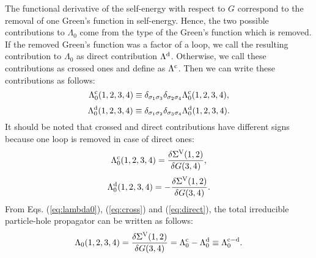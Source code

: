 The functional derivative of the self-energy with respect to $G$ 
correspond to the removal of one Green's function in self-energy. 
Hence, the two possible contributions to $\Lambda_0$ come from
the type of the Green's function which is removed.
If the removed Green's function was a factor of a loop, we call
the resulting contribution to $\Lambda_0$ as direct contribution $\Lambda^{\rm d}$.
Otherwise, we call these contributions as crossed ones and define as $\Lambda^{\rm c}$.
Then we can write these contributions as follows:
%
\begin{equation}
	\Lambda^{\rm c}_0(1,2,3,4) \equiv \delta_{\sigma_1\sigma_3}
	\delta_{\sigma_2\sigma_4}\Lambda^{\rm c}_0(1,2,3,4),
	\label{eq:defcross}
\end{equation}
%
\begin{equation}
	\Lambda^{\rm d}_0(1,2,3,4) \equiv \delta_{\sigma_1\sigma_2}
	\delta_{\sigma_3\sigma_4}\Lambda^{\rm d}_0(1,2,3,4).
	\label{eq:defdirect}
\end{equation}
%
It should be noted that crossed and direct contributions have different 
signs because one loop is removed in case of direct ones:
%
\begin{equation}
	\Lambda^{\rm c}_0(1,2,3,4) = \frac{\delta\Sigma^{\rm V}(1,2)}
	{\delta G(3,4)}, 
	\label{eq:cross}
\end{equation}
%
\begin{equation}
	\Lambda^{\rm d}_0(1,2,3,4) = -\frac{\delta\Sigma^{\rm V}(1,2)}
	{\delta G(3,4)}.
	\label{eq:direct}
\end{equation}
%
From Eqs. (\ref{eq:lambda0}), (\ref{eq:cross}) and (\ref{eq:direct}), 
the total irreducible particle-hole propagator can be written as follows:
%
\begin{equation}
	\Lambda_0(1,2,3,4) = \frac{\delta\Sigma^{\rm V}(1,2)}{\delta G(3,4)}
	= \Lambda^{\rm c}_0 - \Lambda^{\rm d}_0 \equiv \Lambda^{{\rm c} - {\rm d}}_0.
	\label{eq:lambdadiff}
\end{equation}
%
\begin{figure}[h]
\end{figure}
